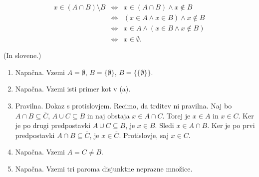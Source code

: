 \begin{answer}{2.8}

\begin{eqnarray*}
x\in (A\cap B )\setminus B  &\Leftrightarrow & x \in (A\cap B)  \wedge x\notin B\\
&\Leftrightarrow & (x\in A\wedge x\in  B ) \wedge x\notin B\\
&\Leftrightarrow & x\in A\wedge (x\in  B  \wedge x\notin B)\\
&\Leftrightarrow & x\in \emptyset.
\end{eqnarray*}
\end{answer}
\begin{answer}{2.10}
 (In slovene.)

\begin{enumerate}
\item Napačna. Vzemi $A=\emptyset$, $B=\{\emptyset\}$, $B=\{\{\emptyset\}\}$.
\item Napačna. Vzemi isti primer kot v (a).
\item Pravilna. Dokaz s protislovjem. Recimo, da trditev ni pravilna. Naj bo $A\cap B\subseteq \overline{C}$, $A\cup C\subseteq B$  in naj obstaja $x\in A\cap C$. Torej je $x\in A$ in $x\in C$. Ker je po drugi predpostavki $A\cup C\subseteq B$, je $x\in B$. Sledi $x\in A \cap B$. Ker je po prvi predpostavki $A\cap B\subseteq \overline{C}$, je $x\in \overline{C}$. Protislovje, saj $x\in C$.
\item Napačna. Vzemi $A=C\neq B$.
\item Napačna. Vzemi tri paroma disjunktne neprazne množice.
\end{enumerate}

\end{answer}

